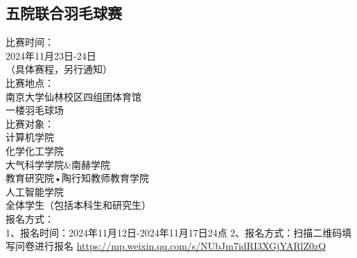\documentclass[letterpaper, 12pt]{article}
\begin{document}
\begin{multicols}{2}
\section{五院联合羽毛球赛}
比赛时间：\\
2024年11月23日-24日\\
（具体赛程，另行通知）\\
比赛地点：\\
南京大学仙林校区四组团体育馆\\
一楼羽毛球场\\
比赛对象：\\
计算机学院\\
化学化工学院\\
大气科学学院\&南赫学院\\
教育研究院•陶行知教师教育学院\\
人工智能学院\\
全体学生（包括本科生和研究生）\\
报名方式：\\
1、报名时间：2024年11月12日-2024年11月17日24点
2、报名方式：扫描二维码填写问卷进行报名
\url{https://mp.weixin.qq.com/s/NUbJm7idRI3XGjYARlZ0zQ}

\end{multicols} 
\end{document}
